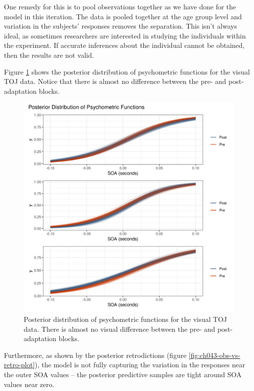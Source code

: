 \documentclass[11pt, oneside, openany]{scrbook}
\begin{document}
One remedy for this is to pool observations together as we have done for the model in this iteration. The data is pooled together at the age group level and variation in the subjects' responses removes the separation. This isn't always ideal, as sometimes researchers are interested in studying the individuals within the experiment. If accurate inferences about the individual cannot be obtained, then the results are not valid.

Figure \ref{fig:ch043-Iron-Intensive} shows the posterior distribution of psychometric functions for the visual TOJ data. Notice that there is almost no difference between the pre- and post-adaptation blocks.

\begin{figure}

{\centering \includegraphics[width=0.85\linewidth]{figures/ch043-Iron-Intensive} 

}

\caption{Posterior distribution of psychometric functions for the visual TOJ data. There is almost no visual difference between the pre- and post-adaptation blocks.}\label{fig:ch043-Iron-Intensive}
\end{figure}

Furthermore, as shown by the posterior retrodictions (figure \ref{fig:ch043-obs-vs-retro-plot}), the model is not fully capturing the variation in the responses near the outer SOA values -- the posterior predictive samples are tight around SOA values near zero.
\end{document}
